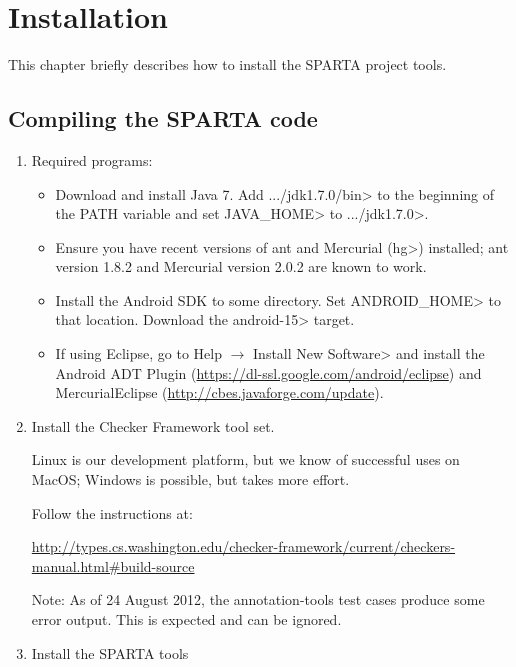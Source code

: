 \htmlhr
\chapter{Installation\label{installation}}

This chapter briefly describes how to install the SPARTA project tools.

\section{Compiling the SPARTA code}

\begin{enumerate}

\item Required programs:

\begin{itemize}
\item Download and install Java 7. Add \<.../jdk1.7.0/bin> to the
  beginning of the PATH variable and set \<JAVA\_HOME> to
  \<.../jdk1.7.0>.

\item Ensure you have recent versions of ant and Mercurial (\<hg>) installed;
  ant version 1.8.2 and Mercurial version 2.0.2 are known to work.

\item Install the Android SDK to some directory. Set \<ANDROID\_HOME> to that
  location.
  Download the \<android-15> target.

\item If using Eclipse, go to
\<Help $\rightarrow$ Install New Software>
and install the Android ADT Plugin (\url{https://dl-ssl.google.com/android/eclipse}) and MercurialEclipse (\url{http://cbes.javaforge.com/update}).

\end{itemize}


\item Install the Checker Framework tool set.

Linux is our development platform, but we know of successful uses on
MacOS; Windows is possible, but takes more effort.

Follow the instructions at:

\url{http://types.cs.washington.edu/checker-framework/current/checkers-manual.html#build-source}

Note: As of 24 August 2012, the annotation-tools test cases
produce some error output. This is expected and can be ignored.


\item
Install the SPARTA tools


\end{enumerate}
